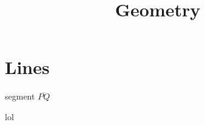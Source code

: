 \documentclass{article}
\title{Geometry}
\begin{document}
\maketitle

\section{Lines}
segment $\overline{PQ}$

lol
\end{document}
